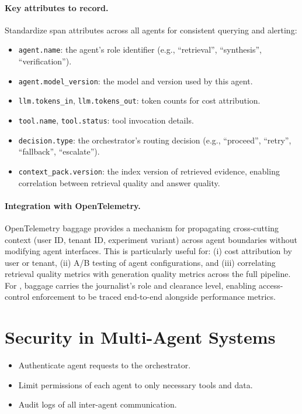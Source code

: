 \paragraph{Key attributes to record.}
Standardize span attributes across all agents for consistent querying and alerting:
\begin{itemize}[leftmargin=1.5em, itemsep=2pt]
  \item \texttt{agent.name}: the agent's role identifier (e.g., ``retrieval'', ``synthesis'', ``verification'').
  \item \texttt{agent.model\_version}: the model and version used by this agent.
  \item \texttt{llm.tokens\_in}, \texttt{llm.tokens\_out}: token counts for cost attribution.
  \item \texttt{tool.name}, \texttt{tool.status}: tool invocation details.
  \item \texttt{decision.type}: the orchestrator's routing decision (e.g., ``proceed'', ``retry'', ``fallback'', ``escalate'').
  \item \texttt{context\_pack.version}: the index version of retrieved evidence, enabling correlation between retrieval quality and answer quality.
\end{itemize}

\paragraph{Integration with OpenTelemetry.}
OpenTelemetry baggage provides a mechanism for propagating cross-cutting context (user ID, tenant ID, experiment variant) across agent boundaries without modifying agent interfaces. This is particularly useful for: (i) cost attribution by user or tenant, (ii) A/B testing of agent configurations, and (iii) correlating retrieval quality metrics with generation quality metrics across the full pipeline. For \ishtar{}, baggage carries the journalist's role and clearance level, enabling access-control enforcement to be traced end-to-end alongside performance metrics.

\section{Security in Multi-Agent Systems}\label{sec:ch09-security}
\begin{itemize}
    \item Authenticate agent requests to the orchestrator.
    \item Limit permissions of each agent to only necessary tools and data.
    \item Audit logs of all inter-agent communication.
\end{itemize}



